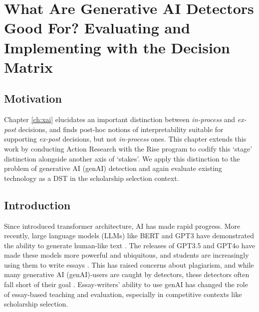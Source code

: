 

\chapter{\label{ch:genai}What Are Generative AI Detectors Good For? Evaluating and Implementing with the Decision Matrix}

\minitoc

\section{Motivation}
Chapter \ref{ch:xai} elucidates an important distinction between \emph{in-process} and \emph{ex-post} decisions, and finds post-hoc notions of interpretability suitable for supporting \emph{ex-post} decisions, but not \emph{in-process} ones. This chapter extends this work by conducting Action Research with the Rise program to codify this `stage' distinction alongside another axis of `stakes'. We apply this distinction to the problem of generative AI (genAI) detection and again evaluate existing technology as a DST in the scholarship selection context.

\section{Introduction}\label{sec:genaiintro}
Since \textcite{ashish_vaswani_attention_2017} introduced transformer architecture, AI has made rapid progress. More recently, large language models (LLMs) like BERT and GPT3 have demonstrated the ability to generate human-like text \cite{jacob_devlin_bert_2018,brown_language_2020}. The releases of GPT3.5 and GPT4o have made these models more powerful and ubiquitous, and students are increasingly using them to write essays \cite{openai_gpt-4_2023,dehouche_plagiarism_2021}. This has raised concerns about plagiarism, and while many generative AI (genAI)-users are caught by detectors, these detectors often fall short of their goal \cite{liang_gpt_2023,kalpesh_krishna_paraphrasing_2023,mitchell_detectgpt_2023,tharindu_kumarage_stylometric_2023,dehouche_plagiarism_2021}. Essay-writers' ability to use genAI has changed the role of essay-based teaching and evaluation, especially in competitive contexts like scholarship selection.

